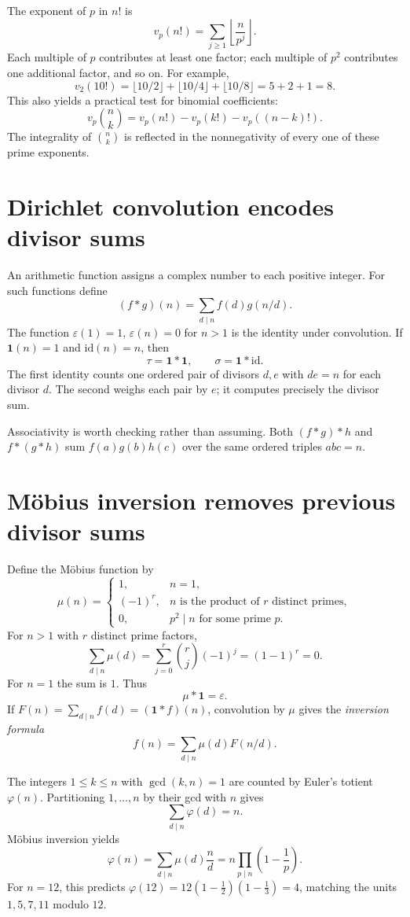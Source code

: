 The exponent of \(p\) in \(n!\) is
\[
 \boxed{v_p(n!)=\sum_{j\ge1}\left\lfloor\frac n{p^j}\right\rfloor.}
\]
Each multiple of \(p\) contributes at least one factor; each multiple of \(p^2\) contributes one additional factor, and so on. For example,
\[
 v_2(10!)=\lfloor10/2\rfloor+\lfloor10/4\rfloor+
 \lfloor10/8\rfloor=5+2+1=8.
\]
This also yields a practical test for binomial coefficients:
\[
 v_p\binom nk=v_p(n!)-v_p(k!)-v_p((n-k)!).
\]
The integrality of \(\binom nk\) is reflected in the nonnegativity of every one of these prime exponents.

\section{Dirichlet convolution encodes divisor sums}

An arithmetic function assigns a complex number to each positive integer. For such functions define
\[
 (f*g)(n)=\sum_{d\mid n}f(d)g(n/d).
\]
The function \(\varepsilon(1)=1\), \(\varepsilon(n)=0\) for \(n>1\) is the identity under convolution. If \(\mathbf1(n)=1\) and \(\mathrm{id}(n)=n\), then
\[
 \tau=\mathbf1*\mathbf1,\qquad
 \sigma=\mathbf1*\mathrm{id}.
\]
The first identity counts one ordered pair of divisors \(d,e\) with \(de=n\) for each divisor \(d\). The second weighs each pair by \(e\); it computes precisely the divisor sum.

Associativity is worth checking rather than assuming. Both \((f*g)*h\) and \(f*(g*h)\) sum \(f(a)g(b)h(c)\) over the same ordered triples \(abc=n\).

\section{Möbius inversion removes previous divisor sums}

Define the Möbius function by
\[
 \mu(n)=
 \begin{cases}
 1,&n=1,\\
 (-1)^r,&n\text{ is the product of }r\text{ distinct primes},\\
 0,&p^2\mid n\text{ for some prime }p.
 \end{cases}
\]
For \(n>1\) with \(r\) distinct prime factors,
\[
 \sum_{d\mid n}\mu(d)=\sum_{j=0}^r\binom rj(-1)^j=(1-1)^r=0.
\]
For \(n=1\) the sum is \(1\). Thus
\[
 \mu*\mathbf1=\varepsilon.
\]
If \(F(n)=\sum_{d\mid n}f(d)=(\mathbf1*f)(n)\), convolution by \(\mu\) gives the \emph{inversion formula}
\[
 f(n)=\sum_{d\mid n}\mu(d)F(n/d).
\]

\begin{example}
The integers \(1\le k\le n\) with \(\gcd(k,n)=1\) are counted by Euler's totient \(\varphi(n)\). Partitioning \(1,\ldots,n\) by their gcd with \(n\) gives
\[
 \sum_{d\mid n}\varphi(d)=n.
\]
Möbius inversion yields
\[
 \varphi(n)=\sum_{d\mid n}\mu(d)\frac nd
 =n\prod_{p\mid n}\left(1-\frac1p\right).
\]
For \(n=12\), this predicts \(\varphi(12)=12(1-\tfrac12)(1-\tfrac13)=4\), matching the units \(1,5,7,11\) modulo \(12\).
\end{example}

